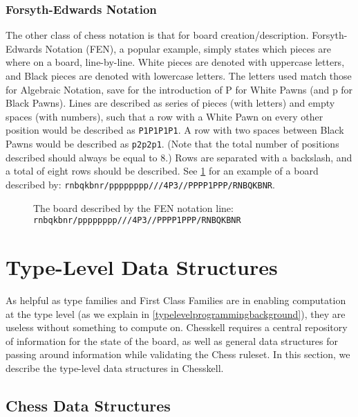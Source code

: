 \subsubsection{Forsyth-Edwards Notation} \label{fensection}

The other class of chess notation is that for board creation/description. Forsyth-Edwards Notation (FEN), a popular example, simply states which pieces are where on a board, line-by-line. White pieces are denoted with uppercase letters, and Black pieces are denoted with lowercase letters. The letters used match those for Algebraic Notation, save for the introduction of P for White Pawns (and p for Black Pawns). Lines are described as series of pieces (with letters) and empty spaces (with numbers), such that a row with a White Pawn on every other position would be described as \texttt{P1P1P1P1}. A row with two spaces between Black Pawns would be described as \texttt{p2p2p1}. (Note that the total number of positions described should always be equal to 8.) Rows are separated with a backslash, and a total of eight rows should be described. See \cref{fenexample} for an example of a board described by: \texttt{rnbqkbnr/\-pppppppp///\-4P3//\-PPPP1PPP/\-RNBQKBNR}.

\begin{figure}[h]
    \centering
    \showboard
    \caption{The board described by the FEN notation line: \texttt{rnbqkbnr/\-pppppppp///\-4P3//\-PPPP1PPP/\-RNBQKBNR}}
    \label{fenexample}
\end{figure}

\section{Type-Level Data Structures}

As helpful as type families and First Class Families are in enabling computation at the type level (as we explain in \cref{typelevelprogrammingbackground}), they are useless without something to compute on. Chesskell requires a central repository of information for the state of the board, as well as general data structures for passing around information while validating the Chess ruleset. In this section, we describe the type-level data structures in Chesskell.

\subsection{Chess Data Structures}

